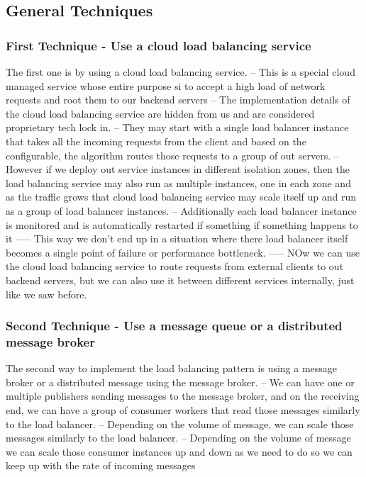 \documentclass[a4paper, 11pt]{book}
\begin{document}
    \subsection{General Techniques}
    \subsubsection{First Technique - Use a cloud load balancing service}
    The first one is by using a cloud load balancing service.
    -- This is a special cloud managed service whose entire purpose si to accept a high load of network requests and root them to our backend servers
    -- The implementation details of the cloud load balancing service are hidden from us and are considered proprietary tech lock in.
    -- They may start with a single load balancer instance that takes all the incoming requests from the client and based on the configurable, the algorithm routes those requests to a group of out servers.
    -- However if we deploy out service instances in different isolation zones, then the load balancing service may also run as multiple instances, one in each zone and as the traffic grows that cloud load balancing service may scale itself up and run as a group of load balancer instances.
    -- Additionally each load balancer instance is monitored and is automatically restarted if something if something happens to it
    ----- This way we don't end up in a situation where there load balancer itself becomes a single point of failure or performance bottleneck.
    ----- NOw we can use the cloud load balancing service to route requests from external clients to out backend servers, but we can also use it between different services internally, just like we saw before.

    \subsubsection{Second Technique - Use a message queue or a distributed message broker}
    The second way to implement the load balancing pattern is using a message broker or a distributed message using the message broker.
    -- We can have one or multiple publishers sending messages to the message broker, and on the receiving end, we can have a group of consumer workers that read those messages similarly to the load balancer.
    -- Depending on the volume of message, we can scale those messages similarly to the load balancer.
    -- Depending on the volume of message we can scale those consumer instances up and down as we need to do so we can keep up with the rate of incoming messages
\end{document}
